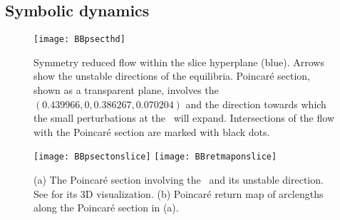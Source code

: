 \documentclass[aip,cha,
reprint,
secnumarabic,
nofootinbib, tightenlines,
nobibnotes, showkeys, showpacs,
groupedaddress,
]{revtex4-1}
\begin{document}
\subsection{Symbolic dynamics}
\begin{figure}%
\centering
 \texttt{[image: BBpsecthd]}
\caption{ Symmetry reduced flow within the slice hyperplane (blue). Arrows
show the unstable directions of the equilibria. Poincar\'e section, shown as
a transparent plane, involves the \reqv\ $(0.439966, 0, 0.386267, 0.070204)$ 
and the direction towards which the small perturbations at the \reqv\ will expand.
Intersections of the flow with the Poincar\'e section are marked with black dots. 
}
\label{fig:BBpsecthd}
\end{figure}

\begin{figure}
\centering
  \texttt{[image: BBpsectonslice]}
  \texttt{[image: BBretmaponslice]}
\caption{(a) The Poincar\'e section involving the \reqv\ and its unstable direction.
		  See  for its 3D visualization. 
		  (b) Poincar\'e return map of arclengths along the Poincar\'e section 
		  in (a).}
\label{fig:psectandretmap}
\end{figure}





\end{document}
